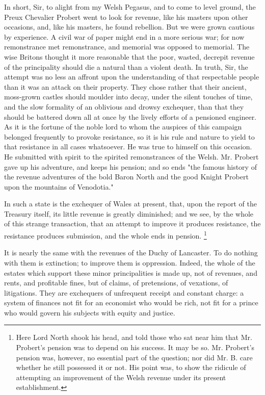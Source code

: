 In short, Sir, to alight from my Welsh Pegasus, and to come to level ground, the Preux Chevalier Probert went to look for revenue, like his masters upon other occasions, and, like his masters, he found rebellion. But we were grown cautious by experience. A civil war of paper might end in a more serious war; for now remonstrance met remonstrance, and memorial was opposed to memorial. The wise Britons thought it more reasonable that the poor, wasted, decrepit revenue of the principality should die a natural than a violent death. In truth, Sir, the attempt was no less an affront upon the understanding of that respectable people than it was an attack on their property. They chose rather that their ancient, moss-grown castles should moulder into decay, under the silent touches of time, and the slow formality of an oblivious and drowsy exchequer, than that they should be battered down all at once by the lively efforts of a pensioned engineer. As it is the fortune of the noble lord to whom the auspices of this campaign belonged frequently to provoke resistance, so it is his rule and nature to yield to that resistance in all cases whatsoever. He was true to himself on this occasion. He submitted with spirit to the spirited remonstrances of the Welsh. Mr. Probert gave up his adventure, and keeps his pension; and so ends "the famous history of the revenue adventures of the bold Baron North and the good Knight Probert upon the mountains of Venodotia."

In such a state is the exchequer of Wales at present, that, upon the report of the Treasury itself, its little revenue is greatly diminished; and we see, by the whole of this strange transaction, that an attempt to improve it produces resistance, the resistance produces submission, and the whole ends in pension.
\footnote{ Here Lord North shook his head, and told those who sat near him that Mr. Probert's pension was to depend on his success. It may be so. Mr. Probert's pension was, however, no essential part of the question; nor did Mr. B. care whether he still possessed it or not. His point was, to show the ridicule of attempting an improvement of the Welsh revenue under its present establishment.}


It is nearly the same with the revenues of the Duchy of Lancaster. To do nothing with them is extinction; to improve them is oppression. Indeed, the whole of the estates which support these minor principalities is made up, not of revenues, and rents, and profitable fines, but of claims, of pretensions, of vexations, of litigations. They are exchequers of unfrequent receipt and constant charge: a system of finances not fit for an economist who would be rich, not fit for a prince who would govern his subjects with equity and justice.

